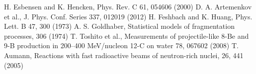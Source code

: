 \documentclass[fontsize=14pt]{scrreport}
\begin{document}
\begin{thebibliography}{57}
 {H. Esbensen and K. Hencken, Phys. Rev. C 61, 054606 (2000)}
 {D. A. Artemenkov et al., J. Phys. Conf. Series 337, 012019 (2012)}
 {H. Feshbach and K. Huang, Phys. Lett. B 47, 300 (1973)}
 {A. S. Goldhaber, Statistical models of fragmentation processes, 306 (1974)}
 {T. Toshito et al., Measurements of projectile-like 8-Be and 9-B production in 200–400 MeV/nucleon 12-C on water 78, 067602 (2008)}
 {T. Aumann, Reactions with fast radioactive beams of neutron-rich nuclei, 26, 441 (2005)}
\end{thebibliography}
\end{document}
